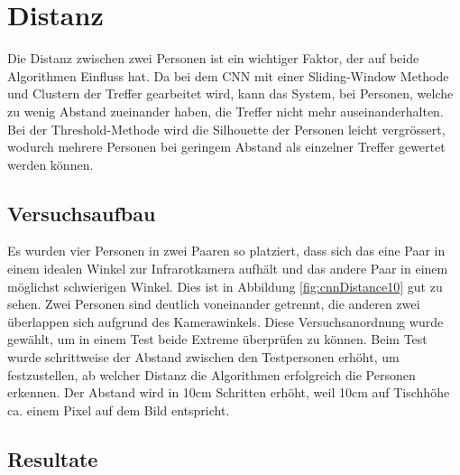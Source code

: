 \section{Distanz}
\label{sec:distanz}

Die Distanz zwischen zwei Personen ist ein wichtiger Faktor, der auf beide Algorithmen Einfluss hat. Da bei dem \gls{CNN} mit einer Sliding-Window Methode und Clustern der Treffer gearbeitet wird, kann das System, bei Personen, welche zu wenig Abstand zueinander haben, die Treffer nicht mehr auseinanderhalten. Bei der Threshold-Methode wird die Silhouette der Personen leicht vergrössert, wodurch mehrere Personen bei geringem Abstand als einzelner Treffer gewertet werden können.

\subsection{Versuchsaufbau}

Es wurden vier Personen in zwei Paaren so platziert, dass sich das eine Paar in einem idealen Winkel zur Infrarotkamera aufhält und das andere Paar in einem möglichst schwierigen Winkel. Dies ist in Abbildung \ref{fig:cnnDistance10} gut zu sehen. Zwei Personen sind deutlich voneinander getrennt, die anderen zwei überlappen sich aufgrund des Kamerawinkels. Diese Versuchsanordnung wurde gewählt, um in einem Test beide Extreme überprüfen zu können. 
Beim Test wurde schrittweise der Abstand zwischen den Testpersonen erhöht, um festzustellen, ab welcher Distanz die Algorithmen erfolgreich die Personen erkennen. Der Abstand wird in 10cm Schritten erhöht, weil 10cm auf Tischhöhe ca. einem Pixel auf dem Bild entspricht.

\subsection{Resultate}

